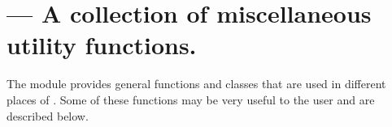 
\section{ --- A collection of miscellaneous utility functions.}
\label{sec:utils}




The  module provides general functions and classes that are used in different places of \pyformex. Some of these functions may be very useful to the user and are described below.


